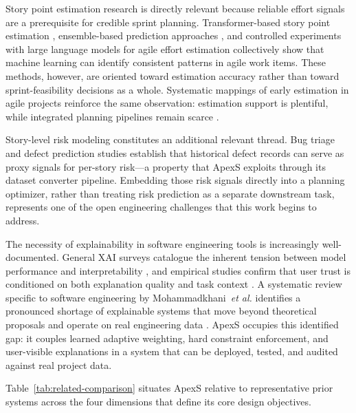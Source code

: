 \documentclass[conference]{IEEEtran}
\begin{document}
Story point estimation research is directly relevant because reliable effort signals
are a prerequisite for credible sprint planning.
Transformer-based story point estimation \cite{gpt2sp}, ensemble-based prediction
approaches \cite{ensemble-spe}, and controlled experiments with large language models
for agile effort estimation \cite{llm-effort} collectively show that machine
learning can identify consistent patterns in agile work items.
These methods, however, are oriented toward estimation accuracy rather than toward
sprint-feasibility decisions as a whole.
Systematic mappings of early estimation in agile projects reinforce the same
observation: estimation support is plentiful, while integrated planning pipelines
remain scarce \cite{agile-estimation-map}.

Story-level risk modeling constitutes an additional relevant thread.
Bug triage and defect prediction studies \cite{bugtriage-deeplearning} establish that
historical defect records can serve as proxy signals for per-story risk---a property
that ApexS exploits through its dataset converter pipeline.
Embedding those risk signals directly into a planning optimizer, rather than
treating risk prediction as a separate downstream task, represents one of the open
engineering challenges that this work begins to address.

The necessity of explainability in software engineering tools is increasingly
well-documented.
General XAI surveys catalogue the inherent tension between model performance and
interpretability \cite{xai-survey}, and empirical studies confirm that user trust is
conditioned on both explanation quality and task context \cite{explanation-matters}.
A systematic review specific to software engineering by Mohammadkhani~\emph{et al.}
identifies a pronounced shortage of explainable systems that move beyond theoretical
proposals and operate on real engineering data \cite{xai-slr-se}.
ApexS occupies this identified gap: it couples learned adaptive weighting, hard
constraint enforcement, and user-visible explanations in a system that can be
deployed, tested, and audited against real project data.

Table~\ref{tab:related-comparison} situates ApexS relative to representative prior
systems across the four dimensions that define its core design objectives.
\end{document}
